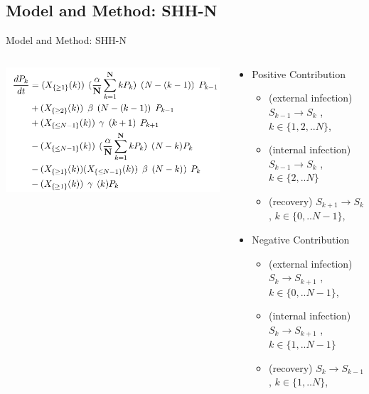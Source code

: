 \documentclass[smaller,aspectratio=169, toc=bibliography]{beamer}
\begin{document}
\subsection*{Model and Method: SHH-N}
\begin{frame}[fragile]{Model and Method: SHH-N}
\begin{columns}[c]
        \begin{center}
        \includegraphics[width=\linewidth]{screenshot/general_SHHN.png}
        \caption{SHH-N} 
        \end{center}
        \begin{center}
        \begin{itemize}
        		\item Positive Contribution
		\begin{itemize}
				\item (external infection) $S_{k-1}\rightarrow S_{k}$ , $k \in \{1,2,..N\}$, 
				\item (internal infection) $S_{k-1}\rightarrow S_{k}$ , $k \in \{2,..N\}$
				\item (recovery) $S_{k+1}\rightarrow S_{k}$ , $k \in \{0,..N-1\}$,
		\end{itemize}  

			\item Negative Contribution
		\begin{itemize}
			\item (external infection) $S_{k}\rightarrow S_{k+1}$ , $k \in \{0,..N-1\}$, 
			\item (internal infection) $S_{k}\rightarrow S_{k+1}$ , $k \in \{1,..N-1\}$
			\item (recovery) $S_{k}\rightarrow S_{k-1}$ , $k \in \{1,..N\}$, 
		\end{itemize}
        		\end{itemize} 
        	\end{center}
	\end{columns}
\end{frame}
\end{document}
